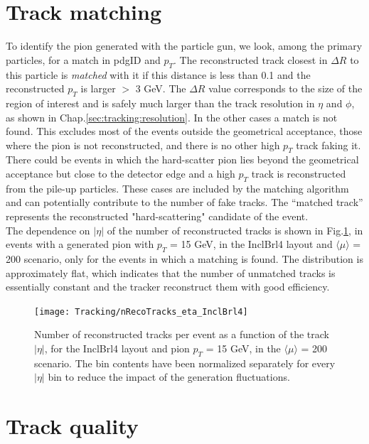 \documentclass[a4paper,twoside,12pt]{book}
\begin{document}
\section{Track matching}\label{subsec:tracking:matching}
To identify the pion generated with the particle gun, we look, among the primary particles, for a match in pdgID and $p_{T}$. The
reconstructed track closest in $\Delta R$ to this particle is \textit{matched} with it if this distance is less than 0.1 and the reconstructed $p_{T}$ is 
larger $>$ 3 GeV. The $\Delta R$ value corresponds to the size of the 
region of interest and is safely much larger than the track resolution in $\eta$ and $\phi$, as shown in Chap.\ref{sec:tracking:resolution}. In the other cases a match
is not found. This excludes most of the events outside the geometrical acceptance, those where the pion is not reconstructed, and there is no other 
high $p_{T}$ track faking it. There could be events in which the hard-scatter pion lies beyond the geometrical acceptance but close to the detector edge 
and a high $p_{T}$ track is reconstructed from the pile-up particles. These cases are included by the matching algorithm and can potentially contribute
to the number of fake tracks. The ``matched track''
represents the reconstructed "hard-scattering" candidate of the event.  \\

The dependence on $|\eta|$ of the number of reconstructed tracks is shown
in Fig.\ref{fig:tracking:nRecoTracks_eta}, in events with a generated pion with $p_{T}$ = 15 GeV,
in the InclBrl4 layout and $\langle\mu\rangle$ = 200 scenario, only for the
events in which a matching is found. The distribution is approximately flat, 
which indicates that the number of unmatched tracks is essentially constant and
the tracker reconstruct them with good efficiency.

\begin{figure}
\centering
\texttt{[image: Tracking/nRecoTracks\_eta\_InclBrl4]}
\caption{Number of reconstructed tracks per event as a function of the
track $|\eta|$, for the InclBrl4 layout and pion $p_{T}$ = 15 GeV, in the $\langle\mu\rangle$ = 200 scenario. The bin contents have been normalized separately for every $|\eta|$ bin to
reduce the impact of the generation fluctuations.}
\label{fig:tracking:nRecoTracks_eta}
\end{figure}


\section{Track quality}\label{subsec:tracking:quality}
\end{document}
